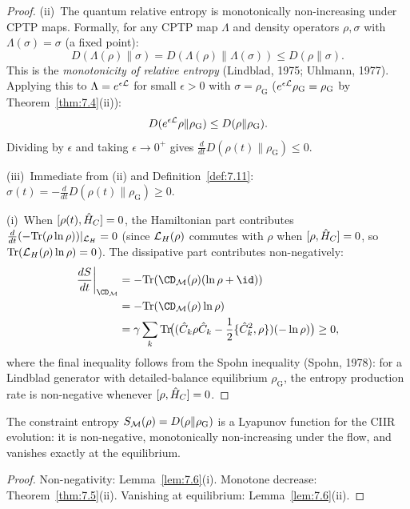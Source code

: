 \begin{proof}
(ii)~The quantum relative entropy is monotonically non-increasing
under CPTP maps.  Formally, for any CPTP map $\Lambda$ and density
operators $\rho, \sigma$ with $\Lambda(\sigma) = \sigma$ (a fixed point):
\[
  D(\Lambda(\rho) \| \sigma)
  = D(\Lambda(\rho) \| \Lambda(\sigma))
  \leq D(\rho \| \sigma).
\]
This is the \emph{monotonicity of relative entropy} (Lindblad, 1975;
Uhlmann, 1977).  Applying this to $\Lambda = e^{\epsilon\mathcal{L}}$ for
small $\epsilon > 0$ with $\sigma = \rho_{\mathrm{G}}$
($e^{\epsilon\mathcal{L}}\rho_{\mathrm{G}} = \rho_{\mathrm{G}}$ by
Theorem~\ref{thm:7.4}(ii)):
\[
  D(e^{\epsilon\mathcal{L}}\rho \| \rho_{\mathrm{G}}) \leq
  D(\rho \| \rho_{\mathrm{G}}).
\]
Dividing by $\epsilon$ and taking $\epsilon \to 0^+$ gives
$\frac{d}{dt}D(\rho(t)\|\rho_{\mathrm{G}}) \leq 0$.

(iii)~Immediate from (ii) and Definition~\ref{def:7.11}:
$\sigma(t) = -\frac{d}{dt}D(\rho(t)\|\rho_{\mathrm{G}}) \geq 0$.

(i)~When $[\rho(t), \hat{H}_C] = 0$, the Hamiltonian part contributes
$\frac{d}{dt}(-\mathrm{Tr}(\rho\ln\rho))|_{\mathcal{L}_H} = 0$ (since
$\mathcal{L}_H(\rho)$ commutes with $\rho$ when $[\rho, \hat{H}_C] = 0$, so
$\mathrm{Tr}(\mathcal{L}_H(\rho)\ln\rho) = 0$).  The dissipative part contributes
non-negatively:
\begin{align*}
  \frac{dS}{dt}\bigg|_{\CD_\CM}
  &= -\Tr(\CD_\CM(\rho)(\ln\rho + \id)) \\
  &= -\Tr(\CD_\CM(\rho)\ln\rho) \\
  &= \gamma\sum_k \Tr\!\bigl(
    (\hatC_k\rho\hatC_k - \frac{1}{2}\{\hatC_k^2,\rho\})(-\ln\rho)
  \bigr) \geq 0,
\end{align*}
where the final inequality follows from the Spohn inequality
(Spohn, 1978): for a Lindblad generator with detailed-balance
equilibrium $\rho_{\mathrm{G}}$, the entropy production rate is
non-negative whenever $[\rho, \hat{H}_C] = 0$.
\end{proof}

\begin{corollary}
\label{cor:7.1}
The constraint entropy $S_{\mathcal{M}}(\rho) = D(\rho\|\rho_{\mathrm{G}})$ is
a Lyapunov function for the CIIR evolution: it is non-negative,
monotonically non-increasing under the flow, and vanishes exactly at the
equilibrium.
\end{corollary}

\begin{proof}
Non-negativity: Lemma~\ref{lem:7.6}(i).  Monotone decrease:
Theorem~\ref{thm:7.5}(ii).  Vanishing at equilibrium:
Lemma~\ref{lem:7.6}(ii).
\end{proof}


